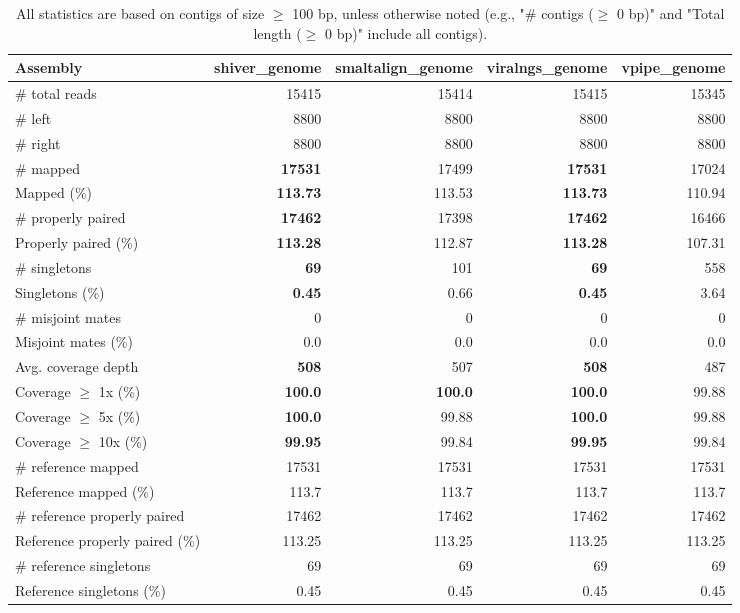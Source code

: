 \documentclass[12pt,a4paper]{article}
\begin{document}
\begin{table}[ht]
\begin{center}
\caption{All statistics are based on contigs of size $\geq$ 100 bp, unless otherwise noted (e.g., "\# contigs ($\geq$ 0 bp)" and "Total length ($\geq$ 0 bp)" include all contigs).}
\begin{tabular}{|l*{4}{|r}|}
\hline
Assembly & shiver\_genome & smaltalign\_genome & viralngs\_genome & vpipe\_genome \\ \hline
\# total reads & 15415 & 15414 & 15415 & 15345 \\ \hline
\# left & 8800 & 8800 & 8800 & 8800 \\ \hline
\# right & 8800 & 8800 & 8800 & 8800 \\ \hline
\# mapped & {\bf 17531} & 17499 & {\bf 17531} & 17024 \\ \hline
Mapped (\%) & {\bf 113.73} & 113.53 & {\bf 113.73} & 110.94 \\ \hline
\# properly paired & {\bf 17462} & 17398 & {\bf 17462} & 16466 \\ \hline
Properly paired (\%) & {\bf 113.28} & 112.87 & {\bf 113.28} & 107.31 \\ \hline
\# singletons & {\bf 69} & 101 & {\bf 69} & 558 \\ \hline
Singletons (\%) & {\bf 0.45} & 0.66 & {\bf 0.45} & 3.64 \\ \hline
\# misjoint mates & 0 & 0 & 0 & 0 \\ \hline
Misjoint mates (\%) & 0.0 & 0.0 & 0.0 & 0.0 \\ \hline
Avg. coverage depth & {\bf 508} & 507 & {\bf 508} & 487 \\ \hline
Coverage $\geq$ 1x (\%) & {\bf 100.0} & {\bf 100.0} & {\bf 100.0} & 99.88 \\ \hline
Coverage $\geq$ 5x (\%) & {\bf 100.0} & 99.88 & {\bf 100.0} & 99.88 \\ \hline
Coverage $\geq$ 10x (\%) & {\bf 99.95} & 99.84 & {\bf 99.95} & 99.84 \\ \hline
\# reference mapped & 17531 & 17531 & 17531 & 17531 \\ \hline
Reference mapped (\%) & 113.7 & 113.7 & 113.7 & 113.7 \\ \hline
\# reference properly paired & 17462 & 17462 & 17462 & 17462 \\ \hline
Reference properly paired (\%) & 113.25 & 113.25 & 113.25 & 113.25 \\ \hline
\# reference singletons & 69 & 69 & 69 & 69 \\ \hline
Reference singletons (\%) & 0.45 & 0.45 & 0.45 & 0.45 \\ \hline

\end{tabular}
\end{center}
\end{table}
\end{document}
